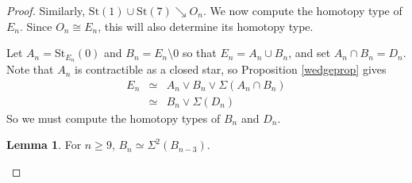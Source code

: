 \documentclass{amsart}
\theoremstyle{definition}
\newtheorem{lemma}[theorem]{Lemma}
\begin{document}
\begin{proof}
Similarly, $\text{St}(1)\cup\text{St}(7)\searrow O_n$.
We now compute the homotopy type of $E_n$. Since $O_n\cong E_n$, this will also determine its homotopy type.

Let $A_n=\text{St}_{E_n}(0)$ and $B_n=E_n\setminus 0$ so that $E_n=A_n\cup B_n$, and set $A_n\cap B_n=D_n$. Note that $A_n$ is contractible as a closed star, so Proposition \ref{wedgeprop} gives 
\begin{eqnarray*}
    E_n &\simeq & A_n\vee B_n\vee\Sigma(A_n\cap B_n)\\
    &\simeq & B_n\vee\Sigma(D_n)
\end{eqnarray*}
So we must compute the homotopy types of $B_n$ and $D_n$.

\begin{lemma}\label{lem:bn}
    For $n\geq 9$, $B_n\simeq\Sigma^2(B_{n-3})$.
\end{lemma}


\end{proof}
\end{document}
